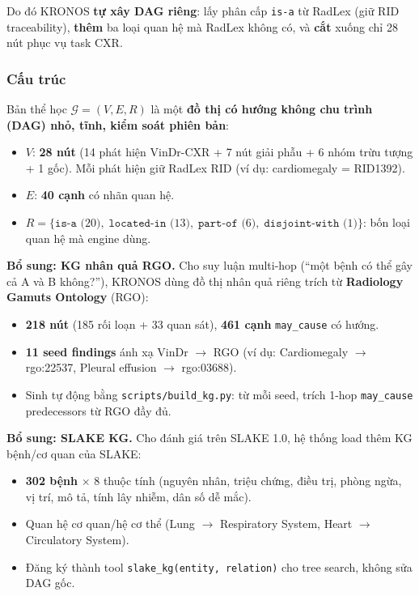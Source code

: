 \documentclass[11pt,a4paper]{article}
\begin{document}
Do đó KRONOS \textbf{tự xây DAG riêng}: lấy phân cấp \texttt{is-a} từ RadLex (giữ RID traceability), \textbf{thêm} ba loại quan hệ mà RadLex không có, và \textbf{cắt} xuống chỉ 28 nút phục vụ task CXR.

\subsubsection{Cấu trúc}
Bản thể học $\mathcal{G} = (V, E, R)$ là một \textbf{đồ thị có hướng không chu trình (DAG) nhỏ, tĩnh, kiểm soát phiên bản}:
\begin{itemize}[leftmargin=1.5em]
  \item $V$: \textbf{28 nút} (14 phát hiện VinDr-CXR + 7 nút giải phẫu + 6 nhóm trừu tượng + 1 gốc). Mỗi phát hiện giữ RadLex RID (ví dụ: cardiomegaly = RID1392).
  \item $E$: \textbf{40 cạnh} có nhãn quan hệ.
  \item $R = \{\texttt{is-a}\text{ (20)},\; \texttt{located-in}\text{ (13)},\; \texttt{part-of}\text{ (6)},\; \texttt{disjoint-with}\text{ (1)}\}$: bốn loại quan hệ mà engine dùng.
\end{itemize}

\textbf{Bổ sung: KG nhân quả RGO.} Cho suy luận multi-hop (``một bệnh có thể gây cả A và B không?''), KRONOS dùng đồ thị nhân quả riêng trích từ \textbf{Radiology Gamuts Ontology} (RGO):
\begin{itemize}[leftmargin=1.5em]
  \item \textbf{218 nút} (185 rối loạn + 33 quan sát), \textbf{461 cạnh} \texttt{may\_cause} có hướng.
  \item \textbf{11 seed findings} ánh xạ VinDr $\to$ RGO (ví dụ: Cardiomegaly $\to$ rgo:22537, Pleural effusion $\to$ rgo:03688).
  \item Sinh tự động bằng \texttt{scripts/build\_kg.py}: từ mỗi seed, trích 1-hop \texttt{may\_cause} predecessors từ RGO đầy đủ.
\end{itemize}

\textbf{Bổ sung: SLAKE KG.} Cho đánh giá trên SLAKE 1.0, hệ thống load thêm KG bệnh/cơ quan của SLAKE:
\begin{itemize}[leftmargin=1.5em]
  \item \textbf{302 bệnh} $\times$ 8 thuộc tính (nguyên nhân, triệu chứng, điều trị, phòng ngừa, vị trí, mô tả, tính lây nhiễm, dân số dễ mắc).
  \item Quan hệ cơ quan/hệ cơ thể (Lung $\to$ Respiratory System, Heart $\to$ Circulatory System).
  \item Đăng ký thành tool \texttt{slake\_kg(entity, relation)} cho tree search, không sửa DAG gốc.
\end{itemize}
\end{document}
